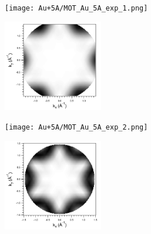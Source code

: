             \begin{figure}
                \centering
                \begin{subfigure}[t]{0.48\textwidth}
                    \centering
                    \texttt{[image: Au+5A/MOT\_Au\_5A\_exp\_1.png]}
                    \label{fig:MOT_Au+5A_exp_1}
                \end{subfigure}
                \begin{subfigure}[t]{0.48\textwidth}
                    \centering
                    \includegraphics[height=4cm]{Au+5A/HOMO_all_CT}
                    \label{fig:MOT_Au+5A_theo_1}
                \end{subfigure}
                \centering
                \begin{subfigure}[t]{0.48\textwidth}
                    \centering
                    \texttt{[image: Au+5A/MOT\_Au\_5A\_exp\_2.png]}
                    \label{fig:MOT_Au+5A_exp_2}
                \end{subfigure}
                \begin{subfigure}[t]{0.48\textwidth}
                    \centering
                    \includegraphics[height=4cm]{Au+5A/HOMO1_all_CT}
                    \label{fig:MOT_Au+5A_theo_2}
                \end{subfigure}

\end{figure}
